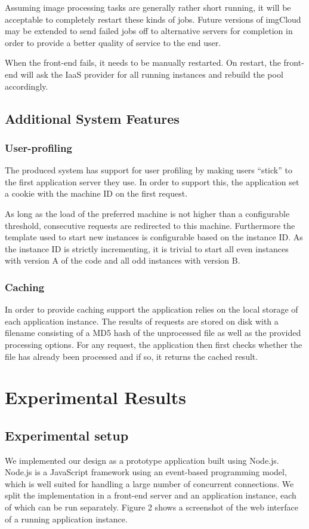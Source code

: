\documentclass[conference]{IEEEtran}
\begin{document}
Assuming image processing tasks are generally rather short running, it will be acceptable to completely restart these kinds of jobs. Future versions of imgCloud may be extended to send failed jobs off to alternative servers for completion in order to provide a better quality of service to the end user.

When the front-end fails, it needs to be manually restarted. On restart, the front-end will ask the IaaS provider for all running instances and rebuild the pool accordingly.


\subsection{Additional System Features}

\subsubsection{User-profiling}
The produced system has support for user profiling by making users ``stick'' to the first application server they use. In order to support this, the application set a cookie with the machine ID on the first request.

As long as the load of the preferred machine is not higher than a configurable threshold, consecutive requests are redirected to this machine. Furthermore the template used to start new instances is configurable based on the instance ID. As the instance ID is strictly incrementing, it is trivial to start all even instances with version A of the code and all odd instances with version B.

\subsubsection{Caching}
In order to provide caching support the application relies on the local storage of each application instance. The results of requests are stored on disk with a filename consisting of a MD5 hash of the unprocessed file as well as the provided processing options. For any request, the application then first checks whether the file has already been processed and if so, it returns the cached result. 

\section{Experimental Results}

\subsection{Experimental setup}
We implemented our design as a prototype application built using Node.js. Node.js \cite{nodejs} is a JavaScript framework using an event-based programming model, which is well suited for handling a large number of concurrent connections. We split the implementation in a front-end server and an application instance, each of which can be run separately. Figure 2 shows a screenshot of the web interface of a running application instance.
\end{document}
